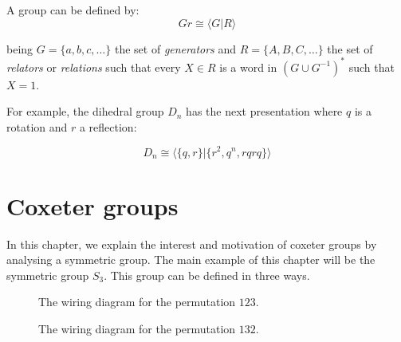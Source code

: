 \begin{definition}
  A group can be defined by:
  \begin{equation}
    Gr \cong \langle G | R\rangle
  \end{equation}

  being $G = \{a,b,c,\dots\}$ the set of \emph{generators} and $R = \{A,B,C,\dots\}$ the set of \emph{relators} or \emph{relations} such that every $X \in R$ is a word in $(G\cup G^{-1})^*$ such that $X = 1$.
\end{definition}

For example, the dihedral group $D_n$ has the next presentation where $q$ is a rotation and $r$ a reflection:

$$D_n \cong \langle \{q,r\} | \{r^2, q^n, rqrq\} \rangle$$

\chapter{Coxeter groups}
In this chapter, we explain the interest and motivation of coxeter groups by analysing a symmetric group. The main example of this chapter will be the symmetric group $S_3$. This group can be defined in three ways.

\begin{figure}
  \begin {center}

  \caption{The wiring diagram for the permutation $123$.}
  \end{center}
\label{fig:wiring}
\end{figure}

\begin{figure}
  \begin {center}
  \caption{The wiring diagram for the permutation $132$.}
  \end{center}
\label{fig:wiring_23}
\end{figure}

